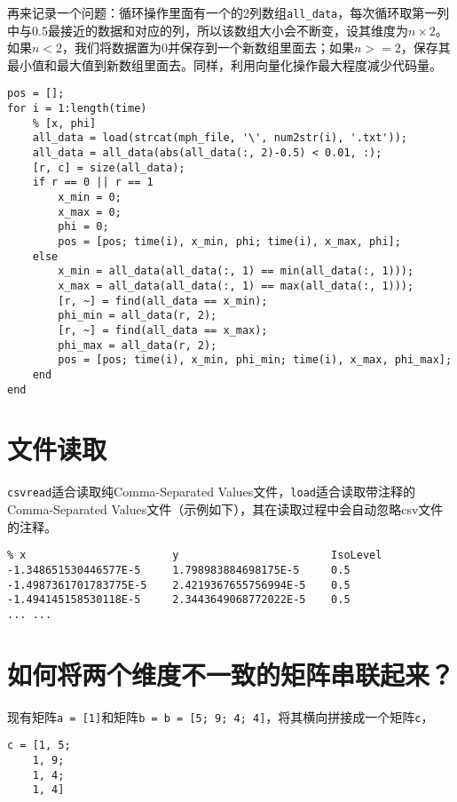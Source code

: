 再来记录一个问题：循环操作里面有一个的2列数组\texttt{all_data}，每次循环取第一列中与0.5最接近的数据和对应的列，所以该数组大小会不断变，设其维度为$ n\times 2 $。如果$ n<2 $，我们将数据置为0并保存到一个新数组里面去；如果$ n>=2 $，保存其最小值和最大值到新数组里面去。同样，利用向量化操作最大程度减少代码量。

\begin{verbatim}
pos = [];
for i = 1:length(time)
    % [x, phi]
    all_data = load(strcat(mph_file, '\', num2str(i), '.txt'));
    all_data = all_data(abs(all_data(:, 2)-0.5) < 0.01, :);
    [r, c] = size(all_data);
    if r == 0 || r == 1
        x_min = 0;
        x_max = 0;
        phi = 0;
        pos = [pos; time(i), x_min, phi; time(i), x_max, phi];
    else
        x_min = all_data(all_data(:, 1) == min(all_data(:, 1)));
        x_max = all_data(all_data(:, 1) == max(all_data(:, 1)));
        [r, ~] = find(all_data == x_min);
        phi_min = all_data(r, 2);
        [r, ~] = find(all_data == x_max);
        phi_max = all_data(r, 2);
        pos = [pos; time(i), x_min, phi_min; time(i), x_max, phi_max];
    end
end
\end{verbatim}

\section{文件读取}

\texttt{csvread}适合读取纯Comma-Separated Values文件，\texttt{load}适合读取带注释的Comma-Separated Values文件（示例如下），其在读取过程中会自动忽略csv文件的注释。

\begin{verbatim}
% x                       y                        IsoLevel
-1.348651530446577E-5     1.798983884698175E-5     0.5
-1.4987361701783775E-5    2.4219367655756994E-5    0.5
-1.494145158530118E-5     2.3443649068772022E-5    0.5
... ...
\end{verbatim}

\section{如何将两个维度不一致的矩阵串联起来？}

现有矩阵\texttt{a = [1]}和矩阵\texttt{b = b = [5; 9; 4; 4]}，将其横向拼接成一个矩阵\texttt{c}，

\begin{verbatim}
c = [1, 5;
    1, 9;
    1, 4;
    1, 4]
\end{verbatim}


